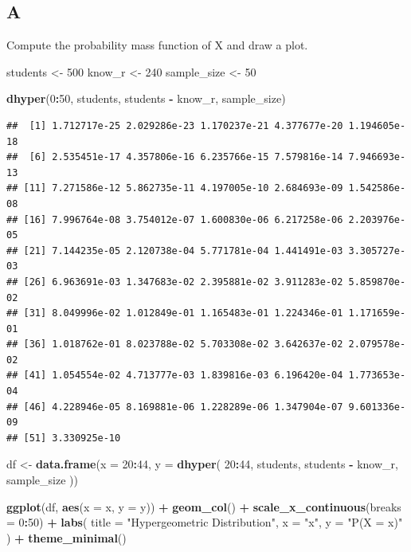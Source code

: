 \documentclass[
]{article}
\newenvironment{Shaded}{\begin{snugshade}}{\end{snugshade}}
\newcommand{\DataTypeTok}[1]{\textcolor[rgb]{0.13,0.29,0.53}{#1}}
\newcommand{\DecValTok}[1]{\textcolor[rgb]{0.00,0.00,0.81}{#1}}
\newcommand{\KeywordTok}[1]{\textcolor[rgb]{0.13,0.29,0.53}{\textbf{#1}}}
\newcommand{\NormalTok}[1]{#1}
\newcommand{\OperatorTok}[1]{\textcolor[rgb]{0.81,0.36,0.00}{\textbf{#1}}}
\newcommand{\StringTok}[1]{\textcolor[rgb]{0.31,0.60,0.02}{#1}}
\begin{document}
\hypertarget{a-4}{%
\subsection{A}\label{a-4}}

Compute the probability mass function of X and draw a plot.

\begin{Shaded}
\begin{Highlighting}[]
\NormalTok{students \textless{}{-}}\StringTok{ }\DecValTok{500}
\NormalTok{know\_r \textless{}{-}}\StringTok{ }\DecValTok{240}
\NormalTok{sample\_size \textless{}{-}}\StringTok{ }\DecValTok{50}

\KeywordTok{dhyper}\NormalTok{(}\DecValTok{0}\OperatorTok{:}\DecValTok{50}\NormalTok{, students, students }\OperatorTok{{-}}\StringTok{ }\NormalTok{know\_r, sample\_size)}
\end{Highlighting}
\end{Shaded}

\begin{verbatim}
##  [1] 1.712717e-25 2.029286e-23 1.170237e-21 4.377677e-20 1.194605e-18
##  [6] 2.535451e-17 4.357806e-16 6.235766e-15 7.579816e-14 7.946693e-13
## [11] 7.271586e-12 5.862735e-11 4.197005e-10 2.684693e-09 1.542586e-08
## [16] 7.996764e-08 3.754012e-07 1.600830e-06 6.217258e-06 2.203976e-05
## [21] 7.144235e-05 2.120738e-04 5.771781e-04 1.441491e-03 3.305727e-03
## [26] 6.963691e-03 1.347683e-02 2.395881e-02 3.911283e-02 5.859870e-02
## [31] 8.049996e-02 1.012849e-01 1.165483e-01 1.224346e-01 1.171659e-01
## [36] 1.018762e-01 8.023788e-02 5.703308e-02 3.642637e-02 2.079578e-02
## [41] 1.054554e-02 4.713777e-03 1.839816e-03 6.196420e-04 1.773653e-04
## [46] 4.228946e-05 8.169881e-06 1.228289e-06 1.347904e-07 9.601336e-09
## [51] 3.330925e-10
\end{verbatim}

\begin{Shaded}
\begin{Highlighting}[]
\NormalTok{df \textless{}{-}}\StringTok{ }\KeywordTok{data.frame}\NormalTok{(}\DataTypeTok{x =} \DecValTok{20}\OperatorTok{:}\DecValTok{44}\NormalTok{, }\DataTypeTok{y =} \KeywordTok{dhyper}\NormalTok{(}
  \DecValTok{20}\OperatorTok{:}\DecValTok{44}\NormalTok{,}
\NormalTok{  students,}
\NormalTok{  students }\OperatorTok{{-}}\StringTok{ }\NormalTok{know\_r,}
\NormalTok{  sample\_size}
\NormalTok{))}

\KeywordTok{ggplot}\NormalTok{(df, }\KeywordTok{aes}\NormalTok{(}\DataTypeTok{x =}\NormalTok{ x, }\DataTypeTok{y =}\NormalTok{ y)) }\OperatorTok{+}
\StringTok{  }\KeywordTok{geom\_col}\NormalTok{() }\OperatorTok{+}
\StringTok{  }\KeywordTok{scale\_x\_continuous}\NormalTok{(}\DataTypeTok{breaks =} \DecValTok{0}\OperatorTok{:}\DecValTok{50}\NormalTok{) }\OperatorTok{+}
\StringTok{  }\KeywordTok{labs}\NormalTok{(}
    \DataTypeTok{title =} \StringTok{"Hypergeometric Distribution"}\NormalTok{,}
    \DataTypeTok{x =} \StringTok{"x"}\NormalTok{,}
    \DataTypeTok{y =} \StringTok{"P(X = x)"}
\NormalTok{  ) }\OperatorTok{+}
\StringTok{  }\KeywordTok{theme\_minimal}\NormalTok{()}
\end{Highlighting}
\end{Shaded}
\end{document}
